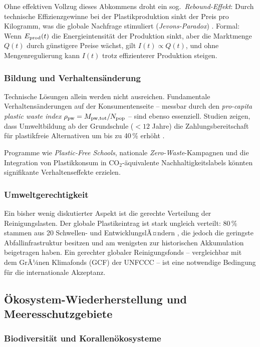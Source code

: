 ﻿\documentclass[12pt,a4paper]{article}
\theoremstyle{definition}
\theoremstyle{remark}
\begin{document}
Ohne effektiven Vollzug dieses Abkommens droht ein sog.\
\textit{Rebound-Effekt}: Durch technische Effizienzgewinne bei der
Plastikproduktion sinkt der Preis pro Kilogramm, was die globale
Nachfrage stimuliert (\textit{Jevons-Paradox}) \cite{jevons1865coal}.
Formal: Wenn $E_{\rm prod}(t)$ die Energieintensit\"at der Produktion
sinkt, aber die Marktmenge $Q(t)$ durch g\"unstigere Preise w\"achst,
gilt $I(t) \propto Q(t)$, und ohne Mengenregulierung kann $I(t)$ trotz
effizienterer Produktion steigen.

\subsubsection{Bildung und Verhaltens\"anderung}

Technische L\"osungen allein werden nicht ausreichen. Fundamentale
Verhaltens\"anderungen auf der Konsumentenseite -- messbar durch den
\textit{pro-capita plastic waste index} $\rho_{\rm pw} = M_{\rm pw,tot} / N_{\rm pop}$
-- sind ebenso essenziell. Studien zeigen, dass Umweltbildung ab der
Grundschule ($<12$ Jahre) die Zahlungsbereitschaft f\"ur plastikfreie
Alternativen um bis zu 40\,\% erh\"oht \cite{hart2019environmental}.

Programme wie \textit{Plastic-Free Schools}, nationale \textit{Zero-Waste}-Kampagnen
und die Integration von Plastikkonsum in CO$_2$-\"aquivalente
Nachhaltigkeitslabels k\"onnten signifikante Verhaltenseffekte erzielen.

\subsubsection{Umweltgerechtigkeit}

Ein bisher wenig diskutierter Aspekt ist die gerechte Verteilung
der Reinigungslasten. Der globale Plastikeintrag ist stark ungleich verteilt:
$80\,\%$ stammen aus 20 Schwellen- und EntwicklungslÃ¤ndern \cite{jambeck2015plastic},
die jedoch die geringste Abfallinfrastruktur besitzen und am wenigsten
zur historischen Akkumulation beigetragen haben. Ein gerechter globaler
Reinigungsfonds -- vergleichbar mit dem GrÃ¼nen Klimafonds (GCF) der UNFCCC --
ist eine notwendige Bedingung f\"ur die internationale Akzeptanz.

\subsection{\"Okosystem-Wiederherstellung und Meeresschutzgebiete}

\subsubsection{Biodiversit\"at und Korallen\"okosysteme}
\end{document}
